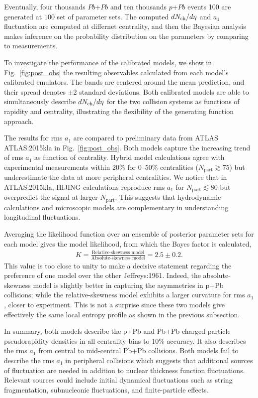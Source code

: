 Eventually, four thousands $Pb$+$Pb$ and ten thousands $p$+$Pb$ events 100 are generated at $100$ set of parameter sets.
The computed $dN_\text{ch}/d\eta$ and $a_1$ fluctuation are computed at differnet centrality, and then the Bayesian analysis makes inference on the probability distribution on the parameters by comparing to measurements.


To investigate the performance of the calibrated models, we show in Fig.~\ref{fig:post_obs} the resulting observables calculated from each model's calibrated emulators.
The bands are centered around the mean prediction, and their spread denotes $\pm 2$ standard deviations.
Both calibrated models are able to simultaneously describe $dN_\text{ch}/d\eta$ for the two collision systems as functions of rapidity and centrality, illustrating the flexibility of the generating function approach.

The results for rms $a_1$ are compared to preliminary data from ATLAS {ATLAS:2015kla} in Fig.~\ref{fig:post_obs}.
Both models capture the increasing trend of rms $a_1$ as function of centrality.
Hybrid model calculations agree with experimental measurements within $20\%$ for $0$--$50\%$ centralities ($N_{\textrm{part}} \gtrsim 75$) but underestimate the data at more peripheral centralities.
We notice that in {ATLAS:2015kla}, \mbox{HIJING} calculations reproduce rms $a_1$ for $N_{\textrm{part}} \lesssim 80$ but overpredict the signal at larger $N_{\textrm{part}}$.
This suggests that hydrodynamic calculations and microscopic models are complementary in understanding longitudinal fluctuations.

Averaging the likelihood function over an ensemble of posterior parameter sets for each model gives the model likelihood, from which the Bayes factor is calculated,
\begin{eqnarray}
K = \frac{\text{Relative-skewness model}}{\text{Absolute-skewness model}} = 2.5 \pm 0.2. 
\end{eqnarray}
This value is too close to unity to make a decisive statement regarding the preference of one model over the other {Jeffreys:1961}.
Indeed, the absolute-skewness model is slightly better in capturing the asymmetries in p+Pb collisions; while the relative-skewness model exhibits a larger curvature for rms $a_1$, closer to experiment.
This is not a surprise since these two models give effectively the same local entropy profile as shown in the previous subsection.

In summary, both models describe the p+Pb and Pb+Pb charged-particle pseudorapidity densities in all centrality bins to 10\% accuracy.
It also describes the rms $a_1$ from central to mid-central Pb+Pb collisions.
Both models fail to describe the rms $a_1$ in peripheral collisions which suggests that additional sources of fluctuation are needed in addition to nuclear thickness function fluctuations.
Relevant sources could include initial dynamical fluctuations such as string fragmentation, subnucleonic fluctuations, and finite-particle effects.


